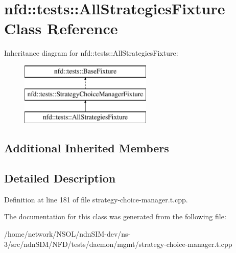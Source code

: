 \hypertarget{classnfd_1_1tests_1_1AllStrategiesFixture}{}\section{nfd\+:\+:tests\+:\+:All\+Strategies\+Fixture Class Reference}
\label{classnfd_1_1tests_1_1AllStrategiesFixture}
Inheritance diagram for nfd\+:\+:tests\+:\+:All\+Strategies\+Fixture\+:\begin{figure}[H]
\begin{center}
\leavevmode
\includegraphics[height=3.000000cm]{classnfd_1_1tests_1_1AllStrategiesFixture}
\end{center}
\end{figure}
\subsection*{Additional Inherited Members}


\subsection{Detailed Description}


Definition at line 181 of file strategy-\/choice-\/manager.\+t.\+cpp.



The documentation for this class was generated from the following file\+:\begin{DoxyCompactItemize}
\item 
/home/network/\+N\+S\+O\+L/ndn\+S\+I\+M-\/dev/ns-\/3/src/ndn\+S\+I\+M/\+N\+F\+D/tests/daemon/mgmt/strategy-\/choice-\/manager.\+t.\+cpp\end{DoxyCompactItemize}
